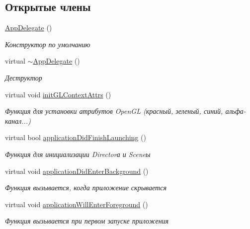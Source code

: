 \subsection*{Открытые члены}
\begin{DoxyCompactItemize}
\item 
\mbox{\label{class_app_delegate_a7d26ade6fbc9d35ecc9185792303f82d}} 
\hyperlink{class_app_delegate_a7d26ade6fbc9d35ecc9185792303f82d}{App\+Delegate} ()
\begin{DoxyCompactList}\small\item\em Конструктор по умолчанию \end{DoxyCompactList}\item 
\mbox{\label{class_app_delegate_a9f89424b5e296e3668deaa0265fc5ac1}} 
virtual \hyperlink{class_app_delegate_a9f89424b5e296e3668deaa0265fc5ac1}{$\sim$\+App\+Delegate} ()
\begin{DoxyCompactList}\small\item\em Деструктор \end{DoxyCompactList}\item 
\mbox{\label{class_app_delegate_a2de4e8ab7d04bde311684e1d4ceb2c0f}} 
virtual void \hyperlink{class_app_delegate_a2de4e8ab7d04bde311684e1d4ceb2c0f}{init\+G\+L\+Context\+Attrs} ()
\begin{DoxyCompactList}\small\item\em Функция для установки атрибутов Open\+GL (красный, зеленый, синий, альфа-\/канал...) \end{DoxyCompactList}\item 
virtual bool \hyperlink{class_app_delegate_a68cbaed49edf7581dc59a09d5062fff3}{application\+Did\+Finish\+Launching} ()
\begin{DoxyCompactList}\small\item\em Функция для инициализации Director\textquotesingle{}а и Scene\textquotesingle{}ы \end{DoxyCompactList}\item 
\mbox{\label{class_app_delegate_a17cb09777419781698324e0415bffd3a}} 
virtual void \hyperlink{class_app_delegate_a17cb09777419781698324e0415bffd3a}{application\+Did\+Enter\+Background} ()
\begin{DoxyCompactList}\small\item\em Функция вызывается, когда приложение скрывается \end{DoxyCompactList}\item 
\mbox{\label{class_app_delegate_ac4d653e3f74a91efef5f2def58fe3108}} 
virtual void \hyperlink{class_app_delegate_ac4d653e3f74a91efef5f2def58fe3108}{application\+Will\+Enter\+Foreground} ()
\begin{DoxyCompactList}\small\item\em Функция вызывается при первом запуске приложения \end{DoxyCompactList}\end{DoxyCompactItemize}


